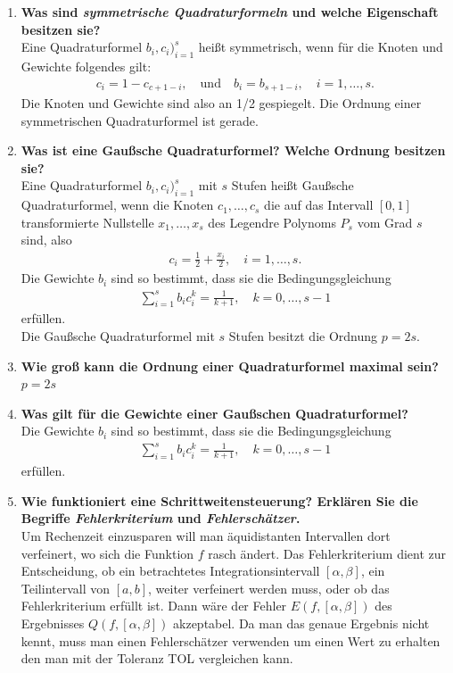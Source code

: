 \begin{enumerate}
		\item \textbf{Was sind \textit{symmetrische Quadraturformeln} und welche Eigenschaft besitzen sie?} \\
			Eine Quadraturformel \(b_i,c_i)^s_{i=1}\) heißt symmetrisch, wenn für die Knoten und Gewichte folgendes gilt:
			\begin{align*}
				c_i=1-c_{c+1-i}, \quad \text{und} \quad b_i=b_{s+1-i}, \quad i=1,\dots,s.
			\end{align*}
			Die Knoten und Gewichte sind also an 1/2 gespiegelt. Die Ordnung einer symmetrischen Quadraturformel ist gerade.
		
		\item \textbf{Was ist eine Gaußsche Quadraturformel? Welche Ordnung besitzen sie?} \\
			Eine Quadraturformel \(b_i,c_i)^s_{i=1}\) mit \(s\) Stufen heißt Gaußsche Quadraturformel, wenn die Knoten \(c_1,\dots,c_s\) die auf das Intervall \([0,1]\) transformierte Nullstelle \(x_1,\dots,x_s\) des Legendre Polynoms \(P_s\) vom Grad \(s\) sind, also
			\begin{align*}
				c_i=\frac{1}{2}+\frac{x_i}{2}, \quad i=1,\dots,s.
			\end{align*}
			Die Gewichte \(b_i\) sind so bestimmt, dass sie die Bedingungsgleichung
			\begin{align*}
				\sum_{i=1}^{s}b_ic_i^k=\frac{1}{k+1}, \quad k=0,\dots,s-1
			\end{align*}
			erfüllen. \\
			Die Gaußsche Quadraturformel mit \(s\) Stufen besitzt die Ordnung \(p=2s\).
			
		\item \textbf{Wie groß kann die Ordnung einer Quadraturformel maximal sein?} \\
			\(p=2s\)
		
		\item \textbf{Was gilt für die Gewichte einer Gaußschen Quadraturformel?} \\
			Die Gewichte \(b_i\) sind so bestimmt, dass sie die Bedingungsgleichung
			\begin{align*}
				\sum_{i=1}^{s}b_ic_i^k=\frac{1}{k+1}, \quad k=0,\dots,s-1
			\end{align*}
			erfüllen.
		\item \textbf{Wie funktioniert eine Schrittweitensteuerung? Erklären Sie die Begriffe \textit{Fehlerkriterium} und \textit{Fehlerschätzer}.} \\
			Um Rechenzeit einzusparen will man äquidistanten Intervallen dort verfeinert, wo sich die Funktion \(f\) rasch ändert.
			Das Fehlerkriterium dient zur Entscheidung, ob ein betrachtetes Integrationsintervall \([\alpha, \beta]\), ein Teilintervall von \([a,b]\), weiter verfeinert werden muss, oder ob das Fehlerkriterium erfüllt ist. Dann wäre der Fehler \(E(f,[\alpha,\beta])\) des Ergebnisses \(Q(f,[\alpha,\beta])\) akzeptabel.
			Da man das genaue Ergebnis nicht kennt, muss man einen Fehlerschätzer verwenden um einen Wert zu erhalten den man mit der Toleranz TOL vergleichen kann.
		

\end{enumerate}
